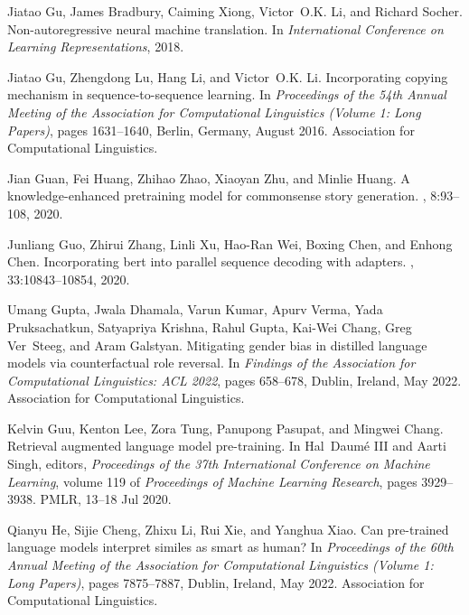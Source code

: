 \documentclass[11pt]{article}
\begin{document}
\begin{thebibliography}{100}
Jiatao Gu, James Bradbury, Caiming Xiong, Victor~O.K. Li, and Richard Socher.
\newblock Non-autoregressive neural machine translation.
\newblock In {\em International Conference on Learning Representations}, 2018.

Jiatao Gu, Zhengdong Lu, Hang Li, and Victor~O.K. Li.
\newblock Incorporating copying mechanism in sequence-to-sequence learning.
\newblock In {\em Proceedings of the 54th Annual Meeting of the Association for
  Computational Linguistics (Volume 1: Long Papers)}, pages 1631--1640, Berlin,
  Germany, August 2016. Association for Computational Linguistics.

Jian Guan, Fei Huang, Zhihao Zhao, Xiaoyan Zhu, and Minlie Huang.
\newblock A knowledge-enhanced pretraining model for commonsense story
  generation.
,
  8:93--108, 2020.

Junliang Guo, Zhirui Zhang, Linli Xu, Hao-Ran Wei, Boxing Chen, and Enhong
  Chen.
\newblock Incorporating bert into parallel sequence decoding with adapters.
,
  33:10843--10854, 2020.

Umang Gupta, Jwala Dhamala, Varun Kumar, Apurv Verma, Yada Pruksachatkun,
  Satyapriya Krishna, Rahul Gupta, Kai-Wei Chang, Greg Ver~Steeg, and Aram
  Galstyan.
\newblock Mitigating gender bias in distilled language models via
  counterfactual role reversal.
\newblock In {\em Findings of the Association for Computational Linguistics:
  ACL 2022}, pages 658--678, Dublin, Ireland, May 2022. Association for
  Computational Linguistics.

Kelvin Guu, Kenton Lee, Zora Tung, Panupong Pasupat, and Mingwei Chang.
\newblock Retrieval augmented language model pre-training.
\newblock In Hal~Daumé III and Aarti Singh, editors, {\em Proceedings of the
  37th International Conference on Machine Learning}, volume 119 of {\em
  Proceedings of Machine Learning Research}, pages 3929--3938. PMLR, 13--18 Jul
  2020.

Qianyu He, Sijie Cheng, Zhixu Li, Rui Xie, and Yanghua Xiao.
\newblock Can pre-trained language models interpret similes as smart as human?
\newblock In {\em Proceedings of the 60th Annual Meeting of the Association for
  Computational Linguistics (Volume 1: Long Papers)}, pages 7875--7887, Dublin,
  Ireland, May 2022. Association for Computational Linguistics.


\end{thebibliography}
\end{document}
